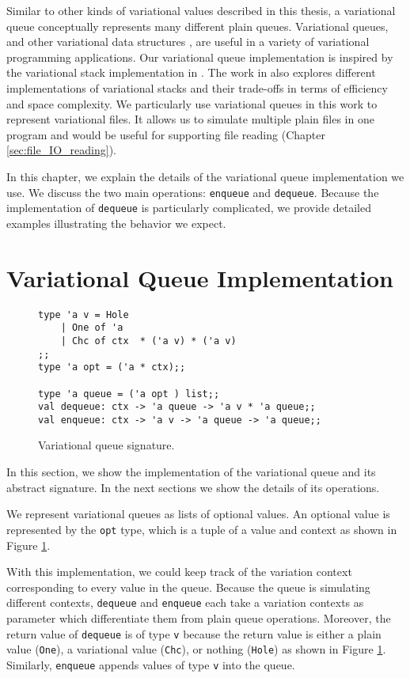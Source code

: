 Similar to other kinds of variational values described in this thesis, a variational queue conceptually represents many different plain queues. Variational queues, and other variational data structures \cite{WKEAB:Onward14}, are useful in a variety of variational programming applications. Our variational queue implementation is inspired by the variational stack implementation in \cite{MMWWK17vamos}. The work in \cite{MMWWK17vamos} also explores different implementations of variational stacks and their trade-offs in terms of efficiency and space complexity. We particularly use variational queues in this work to represent variational files. It allows us to simulate multiple plain files in one program and would be useful for supporting file reading (Chapter \ref{sec:file_IO_reading}). 

In this chapter, we explain the details of the variational queue implementation we use. We discuss the two main operations: \texttt{enqueue} and \texttt{dequeue}. Because the implementation of \texttt{dequeue} is particularly complicated, we provide detailed examples illustrating the behavior we expect. 

\section{Variational Queue Implementation}
\label{sec:queue_impl}

\begin{figure}[h]
\begin{lstlisting}
type 'a v = Hole
    | One of 'a 
    | Chc of ctx  * ('a v) * ('a v) 
;;
type 'a opt = ('a * ctx);; 

type 'a queue = ('a opt ) list;; 
val dequeue: ctx -> 'a queue -> 'a v * 'a queue;;
val enqueue: ctx -> 'a v -> 'a queue -> 'a queue;;
\end{lstlisting}
\caption{Variational queue signature.}
\label{fig:queue_sig}
\end{figure}

In this section, we show the implementation of the variational queue and its abstract signature. In the next sections we show the details of its operations. 

We represent variational queues as lists of optional values. An optional value is represented by the \texttt{opt} type, which is a tuple of a value and context as shown in Figure \ref{fig:queue_sig}.
%

With this implementation, we could keep track of the variation context corresponding to every value in the queue. Because the queue is simulating different contexts, \texttt{dequeue} and \texttt{enqueue} each take a variation contexts as parameter which differentiate them from plain queue operations. Moreover, the return value of \texttt{dequeue} is of type \texttt{v} because the return value is either a plain value (\texttt{One}), a variational value (\texttt{Chc}), or nothing (\texttt{Hole}) as shown in Figure \ref{fig:queue_sig}. Similarly, \texttt{enqueue} appends values of type \texttt{v} into the queue. 

